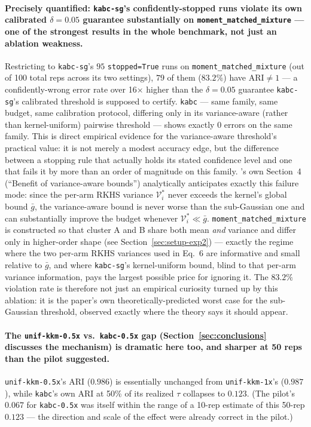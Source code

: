 \documentclass[11pt]{article}
\begin{document}
\paragraph{Precisely quantified: \texttt{kabc-sg}'s confidently-stopped
runs violate its own calibrated $\delta=0.05$ guarantee substantially on
\texttt{moment\_matched\_mixture} --- one of the strongest results in the
whole benchmark, not just an ablation weakness.} Restricting to
\texttt{kabc-sg}'s $95$ \texttt{stopped=True} runs on
\texttt{moment\_matched\_mixture} (out of 100 total reps across its two
settings), $79$ of them ($83.2\%$) have $\text{ARI}\neq 1$ --- a
confidently-wrong error rate over 16$\times$ higher than the $\delta=0.05$
guarantee \texttt{kabc-sg}'s calibrated threshold is supposed to certify.
\texttt{kabc} --- same family, same budget, same calibration protocol,
differing only in its variance-aware (rather than kernel-uniform)
pairwise threshold --- shows exactly $0$ errors on the same family. This
is direct empirical evidence for the variance-aware threshold's practical
value: it is not merely a modest accuracy edge, but the difference between
a stopping rule that actually holds its stated confidence level and one
that fails it by more than an order of magnitude on this family.
\cite{kabc2026}'s own Section~4 (``Benefit of variance-aware bounds'')
analytically anticipates exactly this failure mode: since the per-arm
RKHS variance $\mathcal V_i^*$ never exceeds the kernel's global bound
$\bar g$, the variance-aware bound is never worse than the sub-Gaussian
one and can substantially improve the budget whenever $\mathcal V_i^*\ll
\bar g$. \texttt{moment\_matched\_mixture} is constructed so that cluster
A and B share both mean \emph{and} variance and differ only in
higher-order shape (see Section~\ref{sec:setup-exp2}) --- exactly the
regime where the two per-arm RKHS variances used in Eq.~6 are informative
and small relative to $\bar g$, and where \texttt{kabc-sg}'s
kernel-uniform bound, blind to that per-arm variance information, pays
the largest possible price for ignoring it. The $83.2\%$ violation rate is
therefore not just an empirical curiosity turned up by this ablation: it
is the paper's own theoretically-predicted worst case for the sub-Gaussian
threshold, observed exactly where the theory says it should appear.

\paragraph{The \texttt{unif-kkm-0.5x} vs.\ \texttt{kabc-0.5x} gap
(Section~\ref{sec:conclusions} discusses the mechanism) is dramatic here
too, and sharper at 50 reps than the pilot suggested.}
\texttt{unif-kkm-0.5x}'s ARI ($0.986$) is essentially unchanged from
\texttt{unif-kkm-1x}'s ($0.987$), while \texttt{kabc}'s own ARI at 50\% of
its realized $\tau$ collapses to $0.123$. (The pilot's $0.067$ for
\texttt{kabc-0.5x} was itself within the range of a 10-rep estimate of this
50-rep $0.123$ --- the direction and scale of the effect were already
correct in the pilot.)
\end{document}
